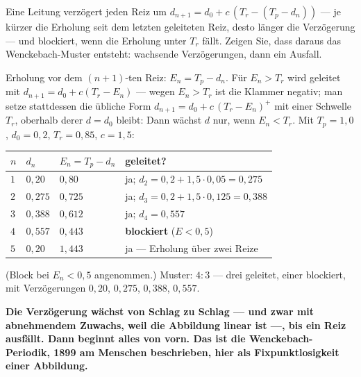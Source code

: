 \begin{aufgabe}
Eine Leitung verzögert jeden Reiz um $d_{n+1} = d_0 + c\,(T_r - (T_p - d_n))$ --- je kürzer die Erholung seit dem letzten geleiteten Reiz, desto länger die Verzögerung --- und blockiert, wenn die Erholung unter $T_r$ fällt. Zeigen Sie, dass daraus das Wenckebach-Muster entsteht: wachsende Verzögerungen, dann ein Ausfall.

\loesung
{}
Erholung vor dem $(n+1)$-ten Reiz: $E_n = T_p - d_n$. Für $E_n > T_r$ wird geleitet mit $d_{n+1} = d_0 + c(T_r - E_n)$ --- wegen $E_n > T_r$ ist die Klammer negativ; man setze stattdessen die übliche Form $d_{n+1} = d_0 + c\,(T_r - E_n)^{+}$ mit einer Schwelle $T_r$, oberhalb derer $d = d_0$ bleibt: Dann wächst $d$ nur, wenn $E_n < T_r$. Mit $T_p = 1{,}0$, $d_0 = 0{,}2$, $T_r = 0{,}85$, $c = 1{,}5$:

\begin{center}
{\small
\renewcommand{\arraystretch}{1.46}
\begin{tabular}{@{}P{1.0cm}P{1.6cm}P{1.8cm}P{2.6cm}@{}}
\toprule
$n$ & $d_n$ & $E_n = T_p - d_n$ & \textbf{geleitet?}\\
\midrule
$1$ & $0{,}20$ & $0{,}80$ & ja; $d_2 = 0{,}2 + 1{,}5\cdot0{,}05 = 0{,}275$\\
$2$ & $0{,}275$ & $0{,}725$ & ja; $d_3 = 0{,}2 + 1{,}5\cdot0{,}125 = 0{,}388$\\
$3$ & $0{,}388$ & $0{,}612$ & ja; $d_4 = 0{,}557$\\
$4$ & $0{,}557$ & $0{,}443$ & \textbf{blockiert} ($E < 0{,}5$)\\
$5$ & $0{,}20$ & $1{,}443$ & ja --- Erholung über zwei Reize\\
\bottomrule
\end{tabular}}
\end{center}
(Block bei $E_n < 0{,}5$ angenommen.) Muster: $4\!:\!3$ --- drei geleitet, einer blockiert, mit Verzögerungen $0{,}20$, $0{,}275$, $0{,}388$, $0{,}557$.

\begin{center}
\begin{minipage}{0.9\textwidth}
\textbf{Die Verzögerung wächst von Schlag zu Schlag --- und zwar mit abnehmendem Zuwachs, weil die Abbildung linear ist ---, bis ein Reiz ausfällt. Dann beginnt alles von vorn. Das ist die Wenckebach-Periodik, 1899 am Menschen beschrieben, hier als Fixpunktlosigkeit einer Abbildung.}
\end{minipage}
\end{center}


\end{aufgabe}

